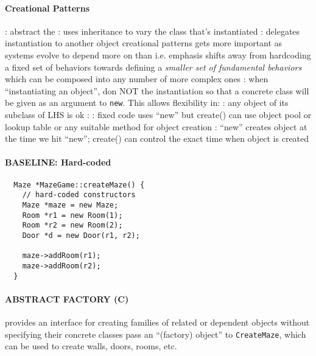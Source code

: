 \documentclass{memo}
\begin{document}
\small

\paragraph{Creational Patterns}
\bit
\w {}: abstract the 
  \bit
  \w {}: uses inheritance to vary the class that's instantiated
  \w {}: delegates instantiation to another object
  \eit
\w creational patterns gets more important as systems evolve to depend more on
 than 
  \bit
  \w i.e. emphasis shifts away from hardcoding a fixed set of behaviors
  towards defining a {\em smaller set of fundamental behaviors \/} which can
  be composed into any number of more complex ones
  \eit
\w {}: when ``instantiating an object'', don NOT  the
instantiation so that a concrete class will be given as an argument to
\verb+new+. This allows flexibility in:
  \bit
  \w {}: any object of its subclass of LHS is ok
  \w {}: 
  \w {}: fixed code uses ``new'' but create() can use
  object pool or lookup table or any suitable method  for object creation
  \w {}: ``new'' creates object at the time we hit
  ``new''; create() can control the exact time when object is created
  \eit
\eit

\paragraph{BASELINE: Hard-coded}
{\scriptsize
\begin{verbatim}
  Maze *MazeGame::createMaze() {
    // hard-coded constructors
    Maze *maze = new Maze;
    Room *r1 = new Room(1);
    Room *r2 = new Room(2);
    Door *d = new Door(r1, r2); 

    maze->addRoom(r1);
    maze->addRoom(r2);
  }
\end{verbatim}
}

\paragraph{ABSTRACT FACTORY (C)}
\bit
\w provides an interface for creating families of related or dependent objects
without specifying their concrete classes
\w pass an ``(factory) object'' to {\tt CreateMaze}, which can be used to
create walls, doors, rooms, etc.
\end{document}
